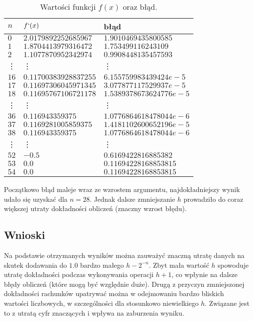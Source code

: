 \documentclass{classrep}
\begin{document}
		\begin{table}[h!]
        	\centering
        	\footnotesize
			\begin{tabular}{lll} \toprule
				$n$ & $f`(x)$ & błąd \\ \midrule
				$0$ & $2.0179892252685967$ & $1.9010469435800585$ \\ 
 				$1$ & $1.8704413979316472$ & $1.753499116243109$ \\
 				$2$ & $1.1077870952342974$ & $0.9908448135457593$ \\
 				\vdots & \vdots & \vdots \\
				$16$ & $0.11700383928837255$ & $6.155759983439424e-5$ \\
				$17$ & $0.11697306045971345$	& $3.077877117529937e-5$ \\
				$18$ & $0.11695767106721178$ & $1.5389378673624776e-5$ \\ 				
				\vdots & \vdots & \vdots \\
 				$36$ & $0.116943359375$ & $1.0776864618478044e-6$ \\
 				$37$ & $0.1169281005859375$ & $1.4181102600652196e-5$ \\
 				$38$ & $0.116943359375$ & $1.0776864618478044e-6$ \\
 				\vdots & \vdots & \vdots \\
 				$52$ & $-0.5$ & $0.6169422816885382$ \\
 				$53$ & $0.0$ & $0.11694228168853815$ \\
 				$54$ & $0.0$ & $0.11694228168853815$ \\\bottomrule
 			\end{tabular}
 			\caption{Wartości funkcji $f(x)$ oraz błąd.}
			\label{table:10}
		\end{table}		
		Początkowo błąd maleje wraz ze wzrostem argumentu, najdokładniejszy wynik udało się uzyskać dla $n=28$. Jednak dalsze 
		zmniejszanie $h$ prowadziło do coraz większej utraty dokładności obliczeń (znaczny wzrost błędu).	
	\subsection{Wnioski}
	Na podstawie otrzymanych wyników można zauważyć znaczną utratę danych na skutek dodawania do $1.0$ bardzo małego $h-2^{-n}$.		
	Zbyt mała wartość $h$ spowoduje utratę dokładności podczas wykonywania operacji $h+1$, co wpłynie na dalsze błędy obliczeń 
	(które mogą być względnie duże). Drugą z przyczyn zmniejszonej dokładności rachunków upatrywać można w odejmowaniu bardzo 
	bliskich wartości liczbowych, w szczególności dla stosunkowo niewielkiego $h$. Związane jest to z utratą cyfr znaczących i 
	wpływa na zaburzenia wyniku.
\end{document}
